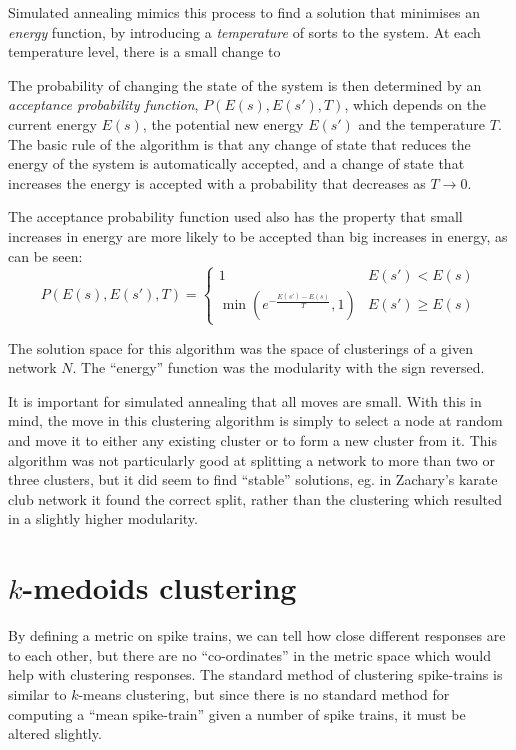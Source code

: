 Simulated annealing mimics this process to find a solution that minimises an \emph{energy} function, by introducing a \emph{temperature} of sorts to the system. At each temperature level, there is a small change to 

The probability of changing the state of the system is then determined by an \emph{acceptance probability function}, $P(E(s),E(s'),T)$, which depends on the current energy $E(s)$, the potential new energy $E(s')$ and the temperature $T$.  The basic rule of the algorithm is that any change of state that reduces the energy of the system is automatically accepted, and a change of state that increases the energy is accepted with a probability that decreases as $T\rightarrow0$.

The acceptance probability function used also has the property that small increases in energy are more likely to be accepted than big increases in energy, as can be seen:
\begin{equation}
P(E(s),E(s'),T) = \left\{ \begin{array}{ll} 1 & E(s')<E(s) \\ \min(e^{-\frac{E(s')-E(s)}{T}},1) & E(s') \geq E(s) \end{array} \right.
\end{equation}

The solution space for this algorithm was the space of clusterings of a given network $N$.  The ``energy'' function was the modularity with the sign reversed.

It is important for simulated annealing that all moves are small.  With this in mind, the move in this clustering algorithm is simply to select a node at random and move it to either any existing cluster or to form a new cluster from it.  This algorithm was not particularly good at splitting a network to more than two or three clusters, but it did seem to find ``stable'' solutions, eg. in Zachary's karate club network \citep{Zachary1977a} it found the correct split, rather than the clustering which resulted in a slightly higher modularity.


\section{$k$-medoids clustering}
By defining a metric on spike trains, we can tell how close different responses 
are to each other, but there are no ``co-ordinates'' in the metric space which 
would help with clustering responses.  The standard method of clustering 
spike-trains is similar to $k$-means clustering, but since there is no standard 
method for computing a ``mean spike-train'' given a number of spike trains, it 
must be altered slightly.

